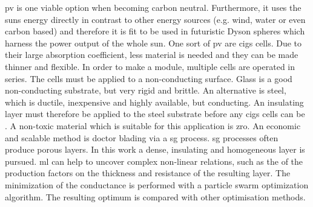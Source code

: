 \Gls{pv} is one viable option when becoming carbon neutral. 
Furthermore, 
it uses the suns energy directly in contrast to other energy sources (e.g. wind, water or even carbon based) and therefore 
it is fit to be used in futuristic Dyson spheres\cite{dyson1960search} which harness the power output of the whole sun.
%
One sort of \gls{pv} are \gls{cigs}\cite{Vasekar2010} cells. 
Due to their large absorption coefficient, less material is needed and they can be made thinner and flexible. 
In order to make a module, multiple cells are operated in series. 
The cells must be applied to a non-conducting surface.
Glass is a good non-conducting substrate, but very rigid and brittle. 
An alternative is steel, which is ductile, inexpensive and highly available, but conducting. 
An insulating layer must therefore be applied to the steel substrate before any \gls{cigs} cells can be .
A non-toxic material which is suitable for this application is \gls{zro}. 
An economic and scalable method is doctor blading via a \gls{sg} process. 
\gls{sg} processes often produce porous layers. 
In this work a dense, insulating and homogeneous layer is pursued. 
\Gls{ml} can help to uncover complex non-linear relations, such as the  of the 
production factors on the thickness and resistance of the resulting layer.
The minimization of the conductance is performed with a particle swarm optimization 
algorithm. 
The resulting optimum is compared with other optimisation methods.


